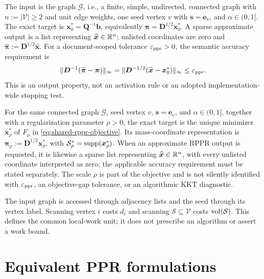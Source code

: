 \documentclass[11pt]{article}
\begin{document}
\begin{problem}
\label{prob:problem-definitions-ppr}
The input is the graph $\mathcal{G}$, i.e., a finite, simple, undirected, connected graph with \(n:=|\mathcal{V}|\geq2\) and unit edge
weights, one seed vertex $v$ with
$\bm{s}=\bm{e}_v$, and $\alpha\in(0,1]$. The exact target is
$\bm{x}_0^*=\bm{Q}^{-1}\bm{b}$, equivalently
$\bm{\pi}=\bm{D}^{1/2}\bm{x}_0^*$. A sparse approximate output is a list
representing $\widehat{\bm{x}}\in\mathbb{R}^n$; unlisted coordinates are zero and
$\widehat{\bm{\pi}}:=\bm{D}^{1/2}\widehat{\bm{x}}$. For a
document-scoped tolerance $\varepsilon_{\mathrm{ppr}}>0$, the semantic accuracy requirement is
\begin{equation}
    \|\bm{D}^{-1}
      (\widehat{\bm{\pi}}-\bm{\pi})\|_\infty
    =
    \|\bm{D}^{-1/2}
      (\widehat{\bm{x}}-\bm{x}_0^*)\|_\infty
    \leq \varepsilon_{\mathrm{ppr}}.
    \label{eq:problem-definitions-semantic-ppr}
\end{equation}
This is an output property, not an activation rule or an adopted
implementation-wide stopping test.
\end{problem}

\begin{problem}
\label{prob:problem-definitions-rppr}
For the same connected graph $\mathcal{G}$, seed vertex $v$,
$\bm{s}=\bm{e}_v$, and $\alpha\in(0,1]$, together with a regularization
parameter $\rho>0$, the exact target is the unique minimizer
$\bm{x}_\rho^*$ of
$F_\rho$ in \cref{eq:shared-rppr-objective}. Its mass-coordinate
representation is $\bm{\pi}_\rho:=\bm{D}^{1/2}\bm{x}_\rho^*$, with
$\mathcal{S}_\rho^*=\operatorname{supp}(\bm{x}_\rho^*)$.
When an approximate RPPR output is requested, it is likewise a sparse list
representing $\widehat{\bm{x}}\in\mathbb{R}^n$, with every unlisted coordinate
interpreted as zero; the applicable accuracy requirement must be stated
separately.
The scale $\rho$ is part of the objective and is not silently identified with
$\varepsilon_{\mathrm{ppr}}$, an objective-gap tolerance, or an algorithmic KKT diagnostic.
\end{problem}

The input graph is accessed through adjacency lists and the seed through its
vertex label.  Scanning vertex $i$ costs $d_i$ and scanning
$\mathcal{S}\subseteq \mathcal{V}$ costs $\operatorname{vol}(\mathcal{S})$. This defines
the common local-work unit; it does not prescribe an algorithm or assert a
work bound.

\section{Equivalent PPR formulations}
\label{sec:problem-definitions-equivalences}
\end{document}
